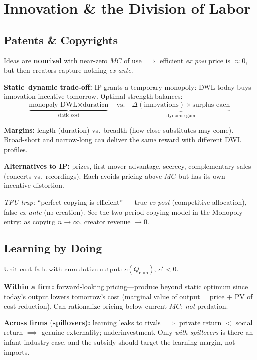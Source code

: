 \section{Innovation \& the Division of Labor}

\subsection{Patents \& Copyrights}
Ideas are \textbf{nonrival} with near-zero $MC$ of use $\implies$ efficient \textit{ex post} price is $\approx 0$, but then creators capture nothing \textit{ex ante}.

\textbf{Static--dynamic trade-off:} IP grants a temporary monopoly: DWL today buys innovation incentive tomorrow. Optimal strength balances:
$$\underbrace{\text{monopoly DWL} \times \text{duration}}_{\text{static cost}} \quad \text{vs.} \quad \underbrace{\Delta(\text{innovations}) \times \text{surplus each}}_{\text{dynamic gain}}$$

\textbf{Margins:} length (duration) vs.\ breadth (how close substitutes may come). Broad-short and narrow-long can deliver the same reward with different DWL profiles.

\textbf{Alternatives to IP:} prizes, first-mover advantage, secrecy, complementary sales (concerts vs.\ recordings). Each avoids pricing above $MC$ but has its own incentive distortion.

\textit{TFU trap:} ``perfect copying is efficient'' --- true \textit{ex post} (competitive allocation), false \textit{ex ante} (no creation). See the two-period copying model in the Monopoly entry: as copying $n \to \infty$, creator revenue $\to 0$.

\subsection{Learning by Doing}
Unit cost falls with cumulative output: $c(Q_{\text{cum}})$, $c' < 0$.

\textbf{Within a firm:} forward-looking pricing---produce beyond static optimum since today's output lowers tomorrow's cost (marginal value of output = price $+$ PV of cost reduction). Can rationalize pricing below current $MC$; \textit{not} predation.

\textbf{Across firms (spillovers):} learning leaks to rivals $\implies$ private return $<$ social return $\implies$ genuine externality; underinvestment. Only \textit{with spillovers} is there an infant-industry case, and the subsidy should target the learning margin, not imports.

